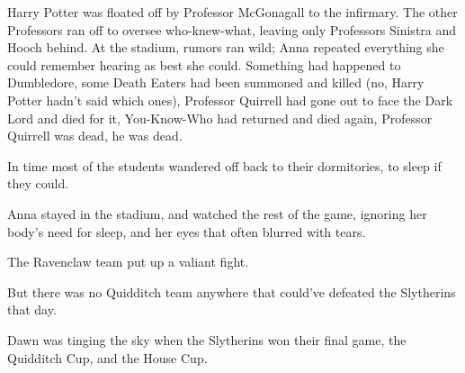 Harry Potter was floated off by Professor McGonagall to the infirmary. The
other Professors ran off to oversee who-knew-what, leaving only Professors
Sinistra and Hooch behind. At the stadium, rumors ran wild; Anna repeated
everything she could remember hearing as best she could. Something had happened
to Dumbledore, some Death Eaters had been summoned and killed (no, Harry Potter
hadn't said which ones), Professor Quirrell had gone out to face the Dark Lord
and died for it, You-Know-Who had returned and died again, Professor Quirrell
was dead, he was dead.

In time most of the students wandered off back to their dormitories, to sleep
if they could.

Anna stayed in the stadium, and watched the rest of the game, ignoring her
body's need for sleep, and her eyes that often blurred with tears.

The Ravenclaw team put up a valiant fight.

But there was no Quidditch team anywhere that could've defeated the Slytherins
that day.

Dawn was tinging the sky when the Slytherins won their final game, the
Quidditch Cup, and the House Cup.
